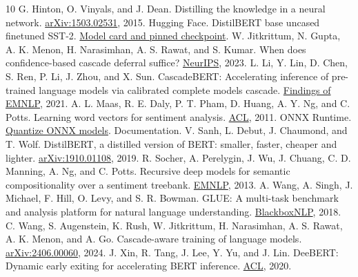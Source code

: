 \documentclass{article}
\begin{document}
\clearpage
\begin{thebibliography}{10}
G. Hinton, O. Vinyals, and J. Dean. Distilling the knowledge in a neural network.
\href{https://arxiv.org/abs/1503.02531}{arXiv:1503.02531}, 2015.
Hugging Face. DistilBERT base uncased finetuned SST-2.
\href{https://huggingface.co/distilbert/distilbert-base-uncased-finetuned-sst-2-english/tree/714eb0fa89d2f80546fda750413ed43d93601a13}{Model card and pinned checkpoint}.
W. Jitkrittum, N. Gupta, A. K. Menon, H. Narasimhan, A. S. Rawat, and S. Kumar.
When does confidence-based cascade deferral suffice?
\href{https://papers.neurips.cc/paper_files/paper/2023/hash/1f09e1ee5035a4c3fe38a5681cae5815-Abstract-Conference.html}{NeurIPS}, 2023.
L. Li, Y. Lin, D. Chen, S. Ren, P. Li, J. Zhou, and X. Sun. CascadeBERT: Accelerating inference of pre-trained language models via calibrated complete models cascade.
\href{https://aclanthology.org/2021.findings-emnlp.43/}{Findings of EMNLP}, 2021.
A. L. Maas, R. E. Daly, P. T. Pham, D. Huang, A. Y. Ng, and C. Potts.
Learning word vectors for sentiment analysis.
\href{https://aclanthology.org/P11-1015/}{ACL}, 2011.
ONNX Runtime. \href{https://onnxruntime.ai/docs/performance/model-optimizations/quantization.html}{Quantize ONNX models}. Documentation.
V. Sanh, L. Debut, J. Chaumond, and T. Wolf. DistilBERT, a distilled version of BERT: smaller, faster, cheaper and lighter.
\href{https://arxiv.org/abs/1910.01108}{arXiv:1910.01108}, 2019.
R. Socher, A. Perelygin, J. Wu, J. Chuang, C. D. Manning, A. Ng, and C. Potts.
Recursive deep models for semantic compositionality over a sentiment treebank.
\href{https://aclanthology.org/D13-1170/}{EMNLP}, 2013.
A. Wang, A. Singh, J. Michael, F. Hill, O. Levy, and S. R. Bowman.
GLUE: A multi-task benchmark and analysis platform for natural language understanding.
\href{https://aclanthology.org/W18-5446/}{BlackboxNLP}, 2018.
C. Wang, S. Augenstein, K. Rush, W. Jitkrittum, H. Narasimhan, A. S. Rawat, A. K. Menon, and A. Go.
Cascade-aware training of language models. \href{https://arxiv.org/abs/2406.00060}{arXiv:2406.00060}, 2024.
J. Xin, R. Tang, J. Lee, Y. Yu, and J. Lin.
DeeBERT: Dynamic early exiting for accelerating BERT inference.
\href{https://aclanthology.org/2020.acl-main.204/}{ACL}, 2020.
\end{thebibliography}
\end{document}
